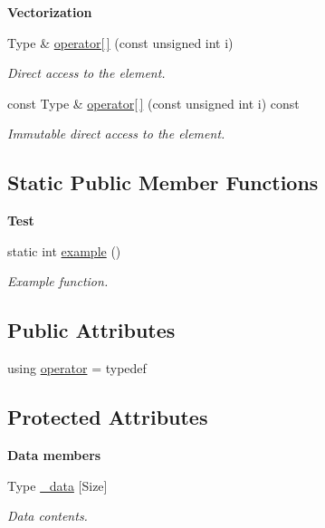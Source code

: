 \begin{Indent}{\bf Vectorization}\par
\begin{DoxyCompactItemize}
\item 
Type \& \hyperlink{exceptionmagrathea_1_1StaticVector_afc2a0d462b9b1dbb1641a486307c0fca}{operator\mbox{[}$\,$\mbox{]}} (const unsigned int i)
\begin{DoxyCompactList}\small\item\em Direct access to the element. \end{DoxyCompactList}\item 
const Type \& \hyperlink{exceptionmagrathea_1_1StaticVector_ac07d57a350e69858e14c33e41490abd9}{operator\mbox{[}$\,$\mbox{]}} (const unsigned int i) const 
\begin{DoxyCompactList}\small\item\em Immutable direct access to the element. \end{DoxyCompactList}\end{DoxyCompactItemize}
\end{Indent}
\subsection*{Static Public Member Functions}
\begin{Indent}{\bf Test}\par
\begin{DoxyCompactItemize}
\item 
static int \hyperlink{exceptionmagrathea_1_1StaticVector_aa5f0e372184d56c61446b82416286e71}{example} ()
\begin{DoxyCompactList}\small\item\em Example function. \end{DoxyCompactList}\end{DoxyCompactItemize}
\end{Indent}
\subsection*{Public Attributes}
\begin{DoxyCompactItemize}
\item 
using \hyperlink{exceptionmagrathea_1_1StaticVector_a08853f59ddbcf3b027c6cb60e38b0e03}{operator} = typedef
\end{DoxyCompactItemize}
\subsection*{Protected Attributes}
\begin{Indent}{\bf Data members}\par
\begin{DoxyCompactItemize}
\item 
Type \hyperlink{exceptionmagrathea_1_1StaticVector_a5e3de461625ff77174f393eae0218599}{\-\_\-data} \mbox{[}Size\mbox{]}
\begin{DoxyCompactList}\small\item\em Data contents. \end{DoxyCompactList}\end{DoxyCompactItemize}
\end{Indent}
